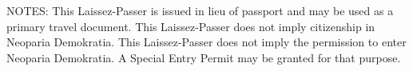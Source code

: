 \hfill%
\par





\vfill
\small
NOTES:
\inlinelistitem This Laissez-Passer is issued in lieu of passport and may be used as a primary travel document.
\inlinelistitem This Laissez-Passer does not imply citizenship in Neoparia Demokratia.
\inlinelistitem This Laissez-Passer does not imply the permission to enter Neoparia Demokratia. A Special Entry Permit may be granted for that purpose.




